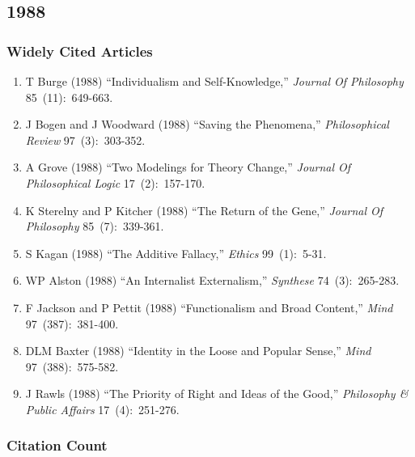 \documentclass[
  10pt,
  letterpaper,
  DIV=11,
  numbers=noendperiod,
  twoside]{scrartcl}
\providecommand{\tightlist}{%
  \setlength{\itemsep}{0pt}\setlength{\parskip}{0pt}}\usepackage{longtable,booktabs,array}
\begin{document}
\newpage

\subsection{1988}\label{sec-s1988}

\subsubsection*{Widely Cited Articles}\label{widely-cited-articles-31}

\begin{enumerate}
\def\labelenumi{\arabic{enumi}.}
\tightlist
\item
  T Burge (1988) ``Individualism and Self-Knowledge,'' \emph{Journal Of
  Philosophy} 85~(11):~649-663.
\item
  J Bogen and J Woodward (1988) ``Saving the Phenomena,''
  \emph{Philosophical Review} 97~(3):~303-352.
\item
  A Grove (1988) ``Two Modelings for Theory Change,'' \emph{Journal Of
  Philosophical Logic} 17~(2):~157-170.
\item
  K Sterelny and P Kitcher (1988) ``The Return of the Gene,''
  \emph{Journal Of Philosophy} 85~(7):~339-361.
\item
  S Kagan (1988) ``The Additive Fallacy,'' \emph{Ethics} 99~(1):~5-31.
\item
  WP Alston (1988) ``An Internalist Externalism,'' \emph{Synthese}
  74~(3):~265-283.
\item
  F Jackson and P Pettit (1988) ``Functionalism and Broad Content,''
  \emph{Mind} 97~(387):~381-400.
\item
  DLM Baxter (1988) ``Identity in the Loose and Popular Sense,''
  \emph{Mind} 97~(388):~575-582.
\item
  J Rawls (1988) ``The Priority of Right and Ideas of the Good,''
  \emph{Philosophy \& Public Affairs} 17~(4):~251-276.
\end{enumerate}

\subsubsection*{Citation Count}\label{sec-count-1988}
\end{document}
